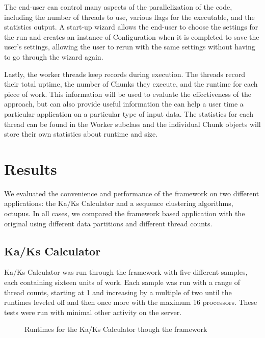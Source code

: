 \documentclass[12pt]{article}
\begin{document}
The end-user can control many aspects of the parallelization of the code,
including the number of threads to use, various flags for the executable, and
the statistics output.  A start-up wizard allows the end-user to choose the
settings for the run and creates an instance of Configuration when it is
completed to save the user's settings, allowing the user to rerun with the same
settings without having to go through the wizard again.

Lastly, the worker threads keep records during execution. The threads record
their total uptime, the number of Chunks they execute, and the runtime for
each piece of work. This information will be used to evaluate the effectiveness
of the approach, but can also provide useful information the can help a user
time a particular application on a particular type of input data. The statistics
for each thread can be found in the Worker subclass and the individual Chunk
objects will store their own statistics about runtime and size.

\section{Results}

We evaluated the convenience and performance of the framework on two different
applications: the Ka/Ks Calculator and a sequence clustering algorithms,
octupus. In all cases, we compared the framework based application with the
original using different data partitions and different thread counts.

\subsection{Ka/Ks Calculator}

Ka/Ks Calculator was run through the framework with five different samples, each
containing sixteen units of work. Each sample was run with a range of thread
counts, starting at 1 and increasing by a multiple of two until the runtimes
leveled off and then once more with the maximum 16 processors. These tests were
run with minimal other activity on the server.

\begin{figure}
    \begin{center}
    \end{center}
    \caption{Runtimes for the Ka/Ks Calculator though the framework}
    \label{fig:time}
\end{figure}
\end{document}
